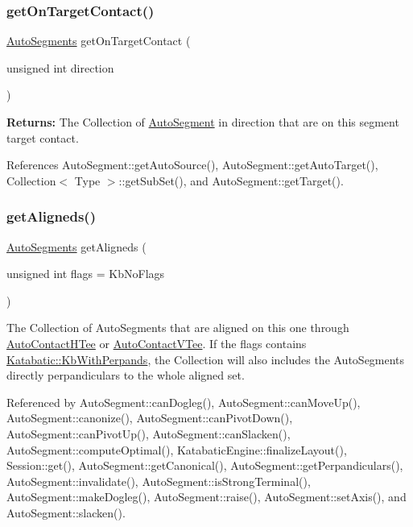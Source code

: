 \subsubsection{\texorpdfstring{get\+On\+Target\+Contact()}{getOnTargetContact()}}
{\footnotesize\ttfamily \hyperlink{namespaceKatabatic_a2221b0ddbc24f331809fc86f98e38041}{Auto\+Segments} get\+On\+Target\+Contact (\begin{DoxyParamCaption}\item[{unsigned int}]{direction }\end{DoxyParamCaption})}

{\bfseries Returns\+:} The Collection of \hyperlink{classKatabatic_1_1AutoSegment}{Auto\+Segment} in {\ttfamily direction} that are on this segment target contact. 

References Auto\+Segment\+::get\+Auto\+Source(), Auto\+Segment\+::get\+Auto\+Target(), Collection$<$ Type $>$\+::get\+Sub\+Set(), and Auto\+Segment\+::get\+Target().

\mbox{\label{classKatabatic_1_1AutoSegment_aaca749f49cd03ca06449d5ea2104033a}} 
\subsubsection{\texorpdfstring{get\+Aligneds()}{getAligneds()}}
{\footnotesize\ttfamily \hyperlink{namespaceKatabatic_a2221b0ddbc24f331809fc86f98e38041}{Auto\+Segments} get\+Aligneds (\begin{DoxyParamCaption}\item[{unsigned int}]{flags = {\ttfamily KbNoFlags} }\end{DoxyParamCaption})}

The Collection of Auto\+Segments that are aligned on this one through \hyperlink{classKatabatic_1_1AutoContactHTee}{Auto\+Contact\+H\+Tee} or \hyperlink{classKatabatic_1_1AutoContactVTee}{Auto\+Contact\+V\+Tee}. If the {\ttfamily flags} contains \hyperlink{namespaceKatabatic_a2af2ad6b6441614038caf59d04b3b217ae2d033c8f78b61468c827de8db5fe839}{Katabatic\+::\+Kb\+With\+Perpands}, the Collection will also includes the Auto\+Segments directly perpandiculars to the whole aligned set. 

Referenced by Auto\+Segment\+::can\+Dogleg(), Auto\+Segment\+::can\+Move\+Up(), Auto\+Segment\+::canonize(), Auto\+Segment\+::can\+Pivot\+Down(), Auto\+Segment\+::can\+Pivot\+Up(), Auto\+Segment\+::can\+Slacken(), Auto\+Segment\+::compute\+Optimal(), Katabatic\+Engine\+::finalize\+Layout(), Session\+::get(), Auto\+Segment\+::get\+Canonical(), Auto\+Segment\+::get\+Perpandiculars(), Auto\+Segment\+::invalidate(), Auto\+Segment\+::is\+Strong\+Terminal(), Auto\+Segment\+::make\+Dogleg(), Auto\+Segment\+::raise(), Auto\+Segment\+::set\+Axis(), and Auto\+Segment\+::slacken().

